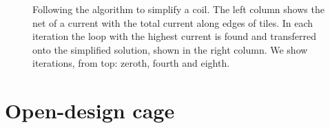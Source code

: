\begin{figure}
  \centering
  \quad
  \caption{Following the algorithm to simplify a coil. The left column shows the net of a current with the total current along edges of tiles. In each iteration the loop with the highest current is found and transferred onto the simplified solution, shown in the right column. We show iterations, from top: zeroth, fourth and eighth.}
  \label{fig:prototype_compensation_time}
\end{figure}



\section{Open-design cage}

